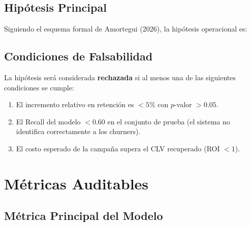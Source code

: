 \documentclass[12pt,a4paper]{article}
\begin{document}
\subsection{Hipótesis Principal}

Siguiendo el esquema formal de Amortegui (2026), la hipótesis operacional es:

\begin{center}
\end{center}

\subsection{Condiciones de Falsabilidad}

La hipótesis será considerada \textbf{rechazada} si al menos una de las siguientes condiciones se cumple:

\begin{enumerate}
    \item El incremento relativo en retención es $< 5\%$ con $p$-valor $> 0.05$.
    \item El Recall del modelo $< 0.60$ en el conjunto de prueba (el sistema no identifica correctamente a los churners).
    \item El costo esperado de la campaña supera el CLV recuperado (ROI $< 1$).
\end{enumerate}

\newpage

\section{Métricas Auditables}

\subsection{Métrica Principal del Modelo}
\end{document}
